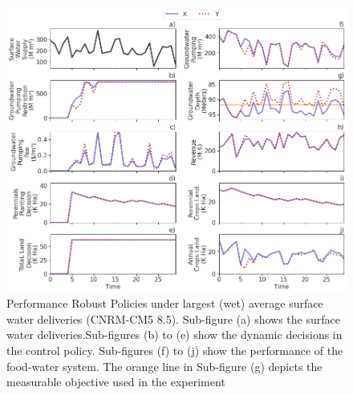 \documentclass[11pt,a4paper]{article}
\begin{document}
\begin{figure}[H]
    \centering
    \includegraphics[width=1\textwidth]{selected_robust_performance_s2_wet.png}
    \caption{Performance Robust Policies under largest (wet) average surface water deliveries (CNRM-CM5 8.5). Sub-figure (a) shows the surface water deliveries.Sub-figures (b) to (e) show the dynamic decisions in the control policy. Sub-figures (f) to (j) show the performance of the food-water system. The orange line in Sub-figure (g) depicts the measurable objective used in the experiment}
    \label{fig:m1esh1}
\end{figure}






\newpage
\printbibliography
\end{document}
